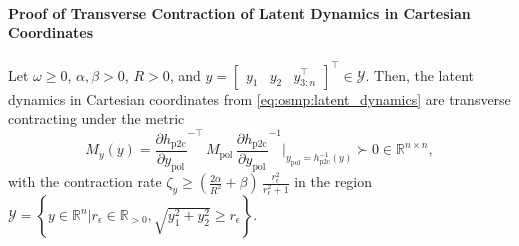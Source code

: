 \paragraph{Proof of Transverse Contraction of Latent Dynamics in Cartesian Coordinates}
\begin{proposition}\label{prop:osmp:cartesian_latent_dynamics_transverse_contraction}
    Let $\omega \geq 0$, $\alpha, \beta > 0$, $R > 0$, and $y = \begin{bmatrix}
    y_1 & y_2 & y_{3:n}^\top
\end{bmatrix}^\top \in \mathcal{Y}$. Then, the latent dynamics in Cartesian coordinates from \eqref{eq:osmp:latent_dynamics} are transverse contracting under the metric
    \begin{equation}\label{eq:osmp:contraction_metric_cartesian_latent_dynamics}
        M_y(y) = \frac{\partial h_{\mathrm{p2c}}}{\partial y_\mathrm{pol}}^{-\top} \, M_\mathrm{pol} \, \frac{\partial h_{\mathrm{p2c}}}{\partial y_\mathrm{pol}}^{-1} \Bigg |_{y_\mathrm{pol} = h_\mathrm{p2c}^{-1}(y)} \succ 0 \in \mathbb{R}^{n \times n},
    \end{equation}
    with the contraction rate $\zeta_y \geq \left (\frac{2\alpha}{R^2} + \beta \right ) \, \frac{r_\epsilon^2}{r_\epsilon^2 + 1}$ in the region $\mathcal{Y} = \left \{ y \in \mathbb{R}^n | r_\epsilon \in \mathbb{R}_{>0}, \sqrt{y_1^2 + y_2^2} \geq r_\epsilon \right \}$.
\end{proposition}
